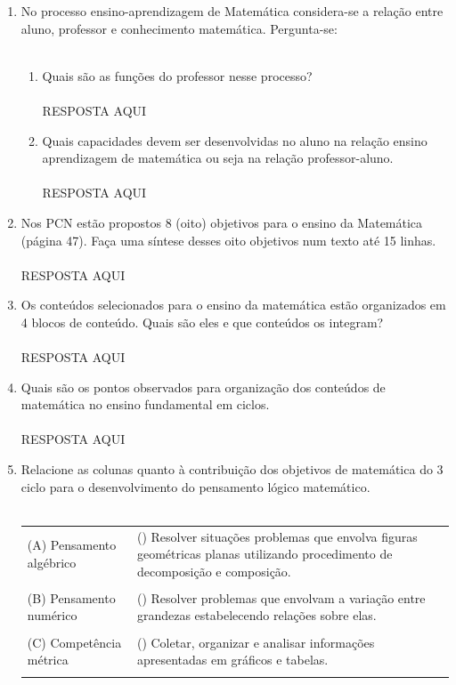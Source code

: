\documentclass[a4paper, 12pt]{article}
\begin{document}
\begin{enumerate}
\item No processo ensino-aprendizagem de Matemática considera-se a relação entre aluno, professor e conhecimento matemática. Pergunta-se: \\ \\ 
  \begin{enumerate}
  \item Quais são as funções do professor nesse processo? \\ \\
     RESPOSTA AQUI
   \item Quais capacidades devem ser desenvolvidas no aluno na relação ensino aprendizagem de matemática ou seja na relação professor-aluno. \\ \\
      RESPOSTA AQUI
  \end{enumerate}
\item Nos PCN estão propostos 8 (oito) objetivos para o ensino da Matemática (página 47). Faça uma síntese desses oito objetivos num texto até 15 linhas. \\ \\
   RESPOSTA AQUI
 \item Os conteúdos selecionados para o ensino da matemática estão organizados em 4 blocos de conteúdo. Quais são eles e que conteúdos os integram? \\ \\
    RESPOSTA AQUI
  \item Quais são os pontos observados para organização dos conteúdos de matemática no ensino fundamental em ciclos. \\ \\
     RESPOSTA AQUI
\item Relacione as colunas quanto à contribuição dos objetivos de matemática do 3 ciclo para o desenvolvimento do pensamento lógico matemático. \\ \\
  \begin{tabular}{m{5cm} m{5cm}}
    (A) Pensamento algébrico & () Resolver situações problemas que envolva figuras geométricas planas utilizando procedimento de decomposição e composição. \\ \\
    (B) Pensamento numérico & () Resolver problemas que envolvam a variação entre grandezas estabelecendo relações sobre elas. \\ \\
    (C) Competência métrica & () Coletar, organizar e analisar informações apresentadas em gráficos e tabelas. \\ \\

\end{tabular}
\end{enumerate}
\end{document}
